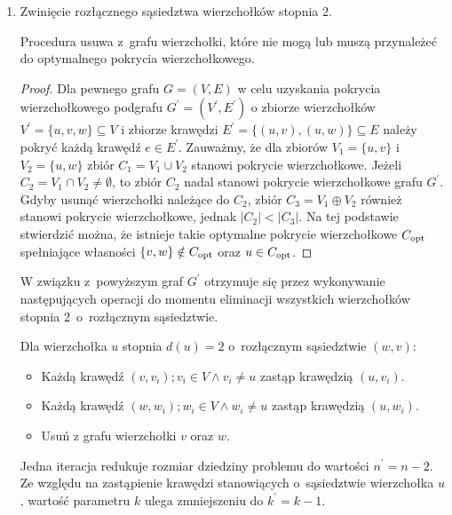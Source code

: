 \begin{enumerate}
  \item Zwinięcie rozłącznego sąsiedztwa wierzchołków stopnia 2.
    \begin{theorem}
      Procedura usuwa z~grafu wierzchołki, które nie mogą lub muszą przynależeć do 
      optymalnego pokrycia wierzchołkowego.
    \end{theorem}
    \begin{proof}
      Dla pewnego grafu $G=(V,E)$ w celu uzyskania pokrycia wierzchołkowego podgrafu $G^\prime=(V^\prime,E^\prime)$ o zbiorze wierzchołków $V^\prime=\{u, v, w\} \subseteq V$ i zbiorze krawędzi $E^\prime=\{(u,v), (u,w)\} \subseteq E$ należy pokryć każdą krawędź $e \in E^\prime$. 
      Zauważmy, że dla zbiorów $V_1=\{u,v\}$ i $V_2=\{u,w\}$ zbiór $C_1=V_1 \cup V_2$ stanowi pokrycie wierzchołkowe.
      Jeżeli $C_2=V_1 \cap V_2 \neq \emptyset$, to zbiór $C_2$ nadal stanowi pokrycie wierzchołkowe grafu $G^\prime$.
      Gdyby usunąć wierzchołki należące do $C_2$, zbiór $C_3=V_1 \oplus V_2$ również stanowi pokrycie wierzchołkowe, jednak $|C_2| < |C_3|$.
      Na tej podstawie stwierdzić można, że istnieje takie optymalne pokrycie wierzchołkowe $C_{\textnormal{opt}}$ spełniające własności $\{v,w\} \notin C_{\textnormal{opt}}$ oraz $u \in C_{\textnormal{opt}}$.
    \end{proof}

    W związku z~powyższym graf $G^\prime$ otrzymuje się przez wykonywanie
    następujących operacji do momentu eliminacji wszystkich wierzchołków stopnia
    2\ o~rozłącznym sąsiedztwie.

    Dla wierzchołka $u$ stopnia $d(u)=2$ o~rozłącznym sąsiedztwie $(w,v)$:
    \begin{itemize}
      \item Każdą krawędź $(v,v_i); v_i \in V \land v_i \neq u$ zastąp 
        krawędzią $(u, v_i)$.
      \item Każdą krawędź $(w,w_i); w_i \in V \land w_i \neq u$ zastąp
        krawędzią $(u, w_i)$.
      \item Usuń z grafu wierzchołki $v$ oraz $w$.
    \end{itemize}
    Jedna iteracja redukuje rozmiar dziedziny problemu do wartości
    $n^\prime=n-2$.
    Ze względu na zastąpienie krawędzi stanowiących o~sąsiedztwie wierzchołka $u$,
    wartość parametru $k$ ulega zmniejszeniu do $k^\prime=k-1$.

\end{enumerate}

